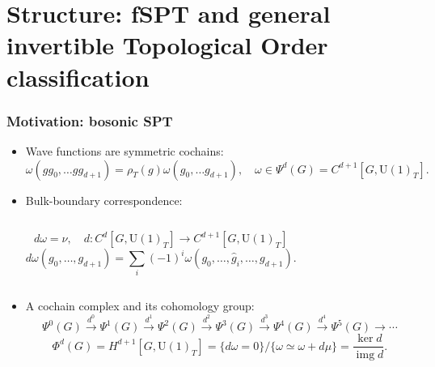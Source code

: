 \documentclass[xcolor=table, aspectratio=169]{beamer}
\newcommand{\uone}{\mathrm U(1)}
\DeclareMathOperator{\img}{img}
\begin{document}
\section{Structure: fSPT and general invertible Topological Order classification}

\begin{frame}
  \frametitle{Motivation: bosonic SPT}
  \begin{itemize}
		\item Wave functions are symmetric cochains:
		\[\omega(gg_0,\ldots gg_{d+1})=\rho_T(g)\omega(g_0,\ldots g_{d+1}),\quad
		\omega\in\Psi^d(G) = C^{d+1}[G, \uone_T].\]
		\item Bulk-boundary correspondence:
		\begin{columns}
			\[d\omega = \nu,\quad d:C^d[G, \uone_T]\rightarrow C^{d+1}[G, \uone_T]\]
			\[d\omega(g_0,\ldots,g_{d+1})
			=\sum_i(-1)^i\omega(g_0,\ldots,\hat g_i,\ldots,g_{d+1}).\]
			\begin{center}
			\end{center}
		\end{columns}
  \item A cochain complex and its cohomology group:
	\[\Psi^0(G)\xrightarrow{d^0}\Psi^1(G)
	\xrightarrow{d^1}\Psi^2(G)
	\xrightarrow{d^2}\Psi^3(G)
	\xrightarrow{d^3}\Psi^4(G)
	\xrightarrow{d^4}\Psi^5(G)
	\rightarrow\cdots\]
\[\Phi^d(G) = H^{d+1}[G,\uone_T]=\{d\omega=0\}/\{\omega\simeq\omega+d\mu\}=\frac{\ker d}{\img d}.\]
  \end{itemize}
\end{frame}
\end{document}
